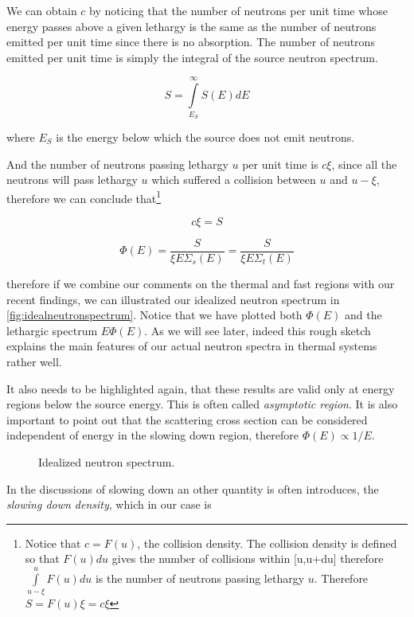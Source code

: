 We can obtain $c$ by noticing that the number of neutrons per unit time whose energy passes above a given lethargy is the same as the number of neutrons emitted per unit time since there is no absorption. The number of neutrons emitted per unit time is simply the integral of the source neutron spectrum.

$$S=\int\limits_{E_S}^\infty S(E)dE$$

\noindent where $E_S$ is the energy below which the source does not emit neutrons. 

And the number of neutrons passing lethargy $u$ per unit time is $c\xi$, since all the neutrons will pass lethargy $u$ which suffered a collision between $u$ and $u-\xi$, therefore we can conclude that\footnote{Notice that $c=F(u)$, the collision density. The collision density is defined so that $F(u)du$ gives the number of collisions within [u,u+du] therefore $\int\limits_{u-\xi}^u F(u)du$ is the number of neutrons passing lethargy $u$. Therefore $S=F(u)\xi=c\xi$ }

$$c\xi=S$$

$$\Phi(E)=\frac{S}{\xi E\Sigma_s(E)}=\frac{S}{\xi E\Sigma_t(E)}$$

\noindent therefore if we combine our comments on the thermal and fast regions with our recent findings, we can illustrated our idealized neutron spectrum in \autoref{fig:idealneutronspectrum}. Notice that we have plotted both $\Phi(E)$ and the lethargic spectrum $E\Phi(E)$. As we will see later, indeed this rough sketch explains the main features of our actual neutron spectra in thermal systems rather well.

It also needs to be highlighted again, that these results are valid only at energy regions below the source energy. This is often called \textit{asymptotic region}. It is also important to point out that the scattering cross section can be considered independent of energy in the slowing down region, therefore $\Phi(E)\propto 1/E$.

\begin{figure}[ht!]
\protect {}\protect
\caption{\label{fig:idealneutronspectrum} \footnotesize{Idealized neutron spectrum.}}
\end{figure}

In the discussions of slowing down an other quantity is often introduces, the \textit{slowing down density}, which in our case is

